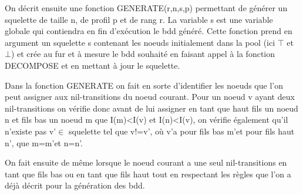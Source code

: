 \documentclass[french]{article}
\begin{document}
On décrit ensuite une fonction GENERATE(r,n,s,p) permettant de générer un squelette de taille n, de profil p et de rang r. La variable s est une variable globale qui contiendra en fin d'exécution le bdd généré.
Cette fonction prend en argument un squelette s contenant les noeuds initialement dans la pool (ici \( \top \) et \( \bot \)) et crée au fur et à mesure le bdd souhaité en faisant appel à la fonction DECOMPOSE et en mettant à jour le squelette.

\begin{algorithm}
  \begin{algorithmic}[1]
    \Statex
            \State {}
                \State {}
                \State {}
            \EndIf
            \Else
                \State {}
                \State {}
                        \EndIf
                    \Else
                        \State {}
                \EndIf
            \EndIf
            \State {}
            \State {}
  \end{algorithmic}
\end{algorithm}


Dans la fonction GENERATE on fait en sorte d'identifier les noeuds que l'on peut assigner aux nil-transitions du noeud courant. Pour un noeud v ayant deux nil-transitions on vérifie donc avant de lui assigner en tant que haut fils un noeud n et fils bas un noeud m que I(m)<I(v) et I(n)<I(v), on vérifie également qu'il n'existe pas v\textquoteright \(\in\) squelette tel que v!=v\textquoteright, où v\textquoteright a pour fils bas m\textquoteright et pour fils haut n\textquoteright, que m=m\textquoteright et n=n\textquoteright.

On fait ensuite de même lorsque le noeud courant a une seul nil-transitions en tant que fils bas ou en tant que fils haut tout en respectant les règles que l'on a déjà décrit pour la génération des bdd. 
\end{document}
